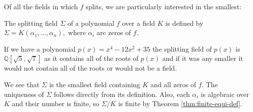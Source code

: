 Of all the fields in which $f$ splits, we are particularly interested in the smallest:

\begin{definition}
    The splitting field $\Sigma$ of a polynomial $f$ over a field $K$ is defined by $\Sigma = K(\alpha_1, \ldots, \alpha_n), $ where $\alpha_i$ are zeros of $f$. 
\end{definition}
\begin{example}
	If we have a polynomial \(p(x) = x^4 - 12x^2 + 35\) the splitting field of \(p(x)\) is \(\mathbb{Q}[\sqrt{5},\sqrt{7}]\) as it contains all of the roots of \(p(x)\) and if it was any smaller it would not contain all of the roots or would not be a field.
\end{example}

We see that $\Sigma$ is the smallest field containing $K$ and all zeros of $f$. The uniqueness of $\Sigma$ follows directly from its definition. Also, each $\alpha_i$ is algebraic over $K$ and their number is finite, so $\Sigma / K$ is finite by Theorem \ref{thm:finite-equi-def}. 


%
%

